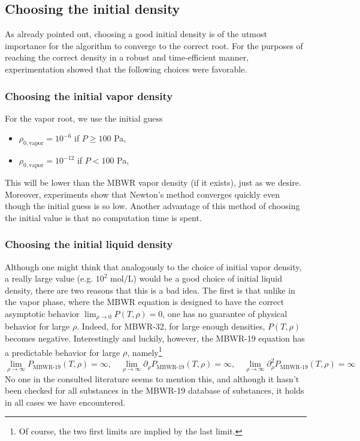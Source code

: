 \documentclass[internal,english]{sintefmemo2012}
\numberwithin{equation}{section}
\begin{document}
\subsection{Choosing the initial density} \label{sec:inDens}
As already pointed out, choosing a good initial density is of the utmost
importance for the algorithm to converge to the correct root. For the purposes of reaching the correct density in a robust and time-efficient manner, experimentation showed that the following choices were favorable.

\subsubsection*{Choosing the initial vapor density}
For the vapor root, we use the initial guess 
\begin{itemize}
\item $\rho_{0,\text{vapor}} = 10^{-6}$ if $P \ge 100$ Pa,
\item $\rho_{0,\text{vapor}} = 10^{-12}$ if $P<100$ Pa,
\end{itemize}
This will be lower than the MBWR vapor density (if it exists), just as we desire. Moreover, experiments show that Newton's method converges quickly even though the initial guess is so low. Another advantage of this method of choosing the initial value is that no computation time is spent.

\subsubsection*{Choosing the initial liquid density}
Although one might think that analogously to the choice of initial
vapor density, a really large value (e.g. $10^{2}$
$\mathrm{mol}/\mathrm{L}$) would be a good choice of initial liquid
density, there are two reasons that this is a bad idea. The first is
that unlike in the vapor phase, where the MBWR equation is designed to
have the correct asymptotic behavior $\lim_{\rho \to 0} P(T,\rho) = 0$, one has no guarantee of physical behavior for large $\rho$. Indeed, for MBWR-32, for large enough densities, $P(T,\rho)$ becomes negative. Interestingly and luckily, however, the MBWR-19 equation has a predictable behavior for large $\rho$, namely\footnote{Of course, the two first limits are implied by the last limit.}
$$
\lim_{\rho \to \infty} P_{\text{MBWR-}19}(T,\rho) = \infty,
\quad \lim_{\rho \to \infty} \partial_\rho
P_{\text{MBWR-}19}(T,\rho) = \infty, \quad \lim_{\rho \to \infty} \partial^2_\rho P_{\text{MBWR-}19}(T,\rho) = \infty
$$
No one in the consulted literature seems to mention this, and although it hasn't been checked for all substances in the MBWR-19 database of substances, it holds in all cases we have encountered.
\end{document}
